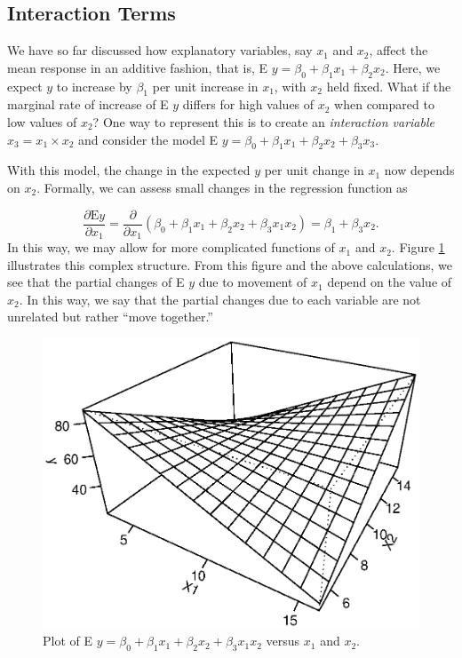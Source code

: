 \subsection{Interaction Terms}

We have so far discussed how explanatory variables, say $x_1$ and
$x_2$, affect the mean response in an additive fashion, that is, E
$y = \beta_0 + \beta_1 x_1 + \beta_2 x_2$. Here, we expect $y$ to
increase by $\beta_1$ per unit increase in $x_1$, with $x_2$ held
fixed. What if the marginal rate of increase of E $y$ differs for
high values of $x_2$ when compared to low values of $x_2$? One way
to represent this is to create an \emph{interaction variable} $x_3 =
x_1 \times x_2$ and consider the model E $y = \beta_0 + \beta_1 x_1
+ \beta_2 x_2 + \beta_3 x_3$.

With this model, the change in the expected $y$ per unit change in
$x_1$ now depends on $x_2$. Formally, we can assess small changes in
the regression function as

\begin{equation*}
\frac{\partial \textrm{E} y}{\partial x_1} =
\frac{\partial}{\partial x_1} \left(\beta_0 + \beta_1 x_1 + \beta_2
x_2 + \beta_3 x_1 x_2 \right) = \beta_1 + \beta_3 x_2 .
\end{equation*}
In this way, we may allow for more complicated functions of $x_1$
and $x_2$. Figure \ref{F3:Interaction} illustrates this complex
structure. From this figure and the above calculations, we see that
the partial changes of E $y$ due to movement of $x_1$ depend on the
value of $x_2$. In this way, we say that the partial changes due to
each variable are not unrelated but rather ``move together.''


\begin{figure}[htp]
  \begin{center}
    \includegraphics[width=.6\textwidth]{Chapter3/F3Interaction.eps}
    \caption{\label{F3:Interaction} \small Plot of E $y = \beta_0 +
         \beta_1 x_1 + \beta_2 x_2 + \beta_3 x_1 x_2$ versus $x_1$ and
          $x_2$.}
  \end{center}
\end{figure}

